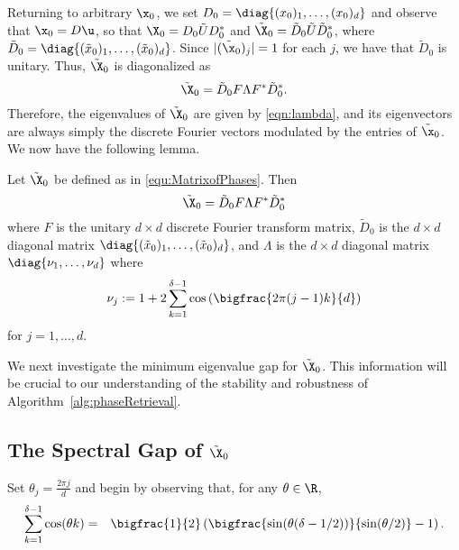 Returning to arbitrary $\x_0$, we set $D_0 = \diag\{(x_0)_1, \ldots, (x_0)_d\}$ and observe that $\x_0 = D \u$, so that $\X_0 = D_0 \tilde{U} D_0^*$ and $\tilde{\X}_0 = \tilde{D}_0 \tilde{U} \tilde{D}_0^*$, where $\tilde{D}_0 = \diag\{(\tilde{x}_0)_1, \ldots, (\tilde{x}_0)_d\}$.  Since $|(\tilde{\x}_0)_j| = 1$ for each $j$, we have that $\tilde{D}_0$ is unitary.  Thus, $\tilde{\X}_0$ is diagonalized as
\begin{equation} \tilde{\X}_0 = \tilde{D}_0 F \Lambda F^* \tilde{D}_0^*. \label{eqn:diagonalization}\end{equation}
Therefore, the eigenvalues of $\tilde{\X}_0$ are given by \eqref{eqn:lambda}, and its eigenvectors are always simply the discrete Fourier vectors modulated by the entries of $\tilde{\x}_0$.  
We now have the following lemma.

\begin{lem}
Let $\tilde{\X}_0$ be defined as in \eqref{equ:MatrixofPhases}.  Then $$\tilde{\X}_0 = \tilde{D}_0 F \Lambda F^* \tilde{D}_0^*$$ where $F$ is the unitary $d \times d$ discrete Fourier transform matrix, $\tilde{D}_0$ is the $d \times d$ diagonal matrix $\diag\{(\tilde{x}_0)_1, \ldots, (\tilde{x}_0)_d\}$, and $\Lambda$ is the $d \times d$ diagonal matrix $\diag\{\nu_1, \ldots, \nu_{d}\}$ where
$$\nu_j := 1 + 2 \sum_{k = 1}^{\delta - 1}\cos\left(\bigfrac{2\pi (j-1) k}{d}\right)$$
for $j = 1, \dots, d$.
\label{lem:spectrum}
\end{lem}

We next investigate the minimum eigenvalue gap for $\tilde{\X}_0$.  This information will be crucial to our understanding of the stability and robustness of Algorithm~\ref{alg:phaseRetrieval}.  

\subsection{The Spectral Gap of $\tilde{\X}_0$}

Set $\theta_j = \frac{2 \pi j}{d}$ and begin by observing that, for any $\theta \in \R$,
\begin{eqnarray*}
  \sum_{k = 1}^{\delta - 1}\cos(\theta k) %
  & = & \bigfrac{1}{2}\left(\bigfrac{\sin(\theta(\delta - 1/2))}{\sin(\theta / 2)} - 1\right).
\end{eqnarray*}

